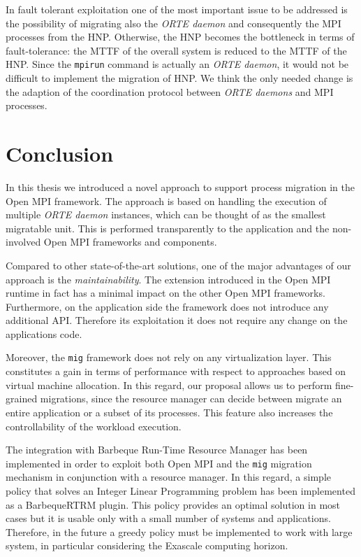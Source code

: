 In fault tolerant exploitation one of the most important issue to be addressed
is the possibility of migrating also the \emph{ORTE daemon} and
consequently the MPI processes from the HNP. Otherwise, the HNP becomes the
bottleneck in terms of fault-tolerance: the MTTF of the overall system is
reduced to the MTTF of the HNP. Since the \texttt{mpirun} command is actually
an \emph{ORTE daemon}, it would not be difficult to implement the migration of
HNP. We think the only needed change is the adaption of the coordination
protocol between \emph{ORTE daemons} and MPI processes.

\section{Conclusion}

In this thesis we introduced a novel approach to support process migration in
the Open MPI framework. The approach is based on handling the execution of
multiple \emph{ORTE daemon} instances, which can be thought of as the smallest
migratable unit. This is performed transparently to the application and the
non-involved Open MPI frameworks and components.

Compared to other state-of-the-art solutions, one of the major advantages
of our approach is the \emph{maintainability}. The extension introduced in the
Open MPI runtime in fact has a minimal impact on the other Open MPI frameworks.
Furthermore, on the application side the framework does not introduce any
additional API. Therefore its
exploitation it does not require any change on the applications code.

Moreover, the \texttt{mig} framework does not rely on any virtualization layer.
This constitutes a gain in terms of performance with respect to approaches
based
on virtual machine allocation. In this regard, our proposal allows us to
perform
fine-grained migrations, since the resource manager can decide between migrate
an entire application or a subset of its processes. This feature also
increases the controllability of the workload execution.

The integration with Barbeque Run-Time Resource Manager has been implemented
in order to exploit both Open MPI and the \texttt{mig} migration mechanism
in conjunction with a resource manager.
In this regard, a simple policy that solves an
Integer Linear Programming problem has been implemented as a BarbequeRTRM plugin.
This policy 
provides an optimal solution in most cases but it is
usable only with a small number of systems and applications. Therefore,
in the future a greedy policy must be implemented to work with large system,
in particular considering the Exascale computing horizon.

